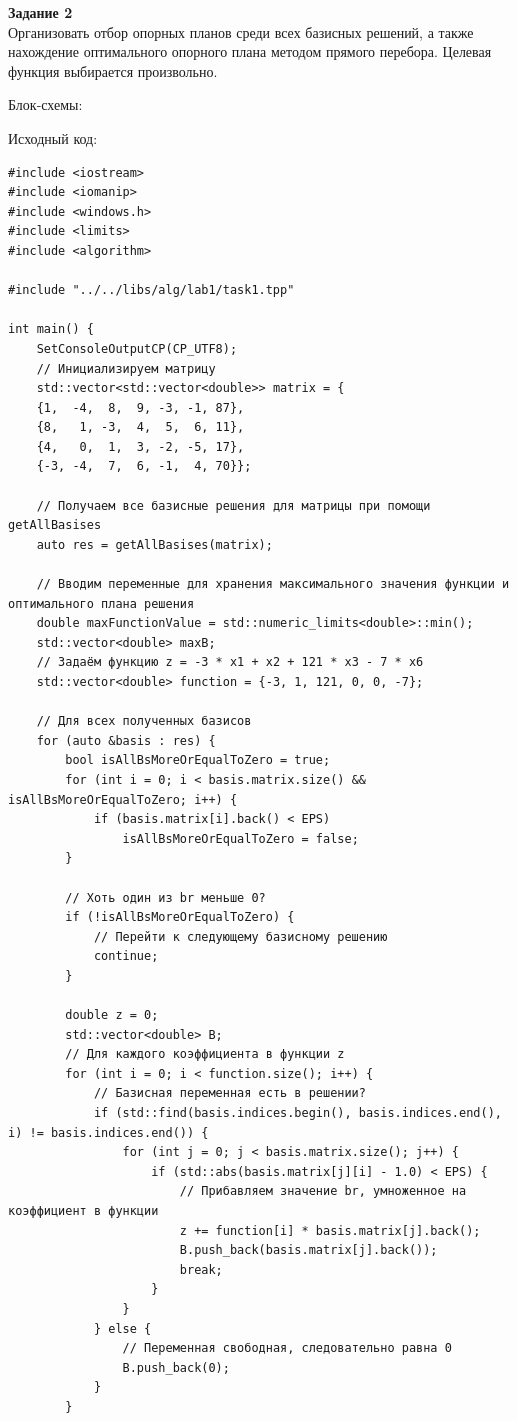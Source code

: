 \documentclass[a4paper,14pt]{extarticle}
\begin{document}
\textbf{Задание 2}\\
Организовать отбор опорных планов среди всех базисных решений, а также нахождение
оптимального опорного плана методом прямого перебора. Целевая функция выбирается
произвольно.\bigbreak

Блок-схемы:
\begin{center}
    
\end{center}
Исходный код:
\begin{verbatim}
#include <iostream>
#include <iomanip>
#include <windows.h>
#include <limits>
#include <algorithm>

#include "../../libs/alg/lab1/task1.tpp"

int main() {
    SetConsoleOutputCP(CP_UTF8);
    // Инициализируем матрицу
    std::vector<std::vector<double>> matrix = {
    {1,  -4,  8,  9, -3, -1, 87},
    {8,   1, -3,  4,  5,  6, 11},
    {4,   0,  1,  3, -2, -5, 17},
    {-3, -4,  7,  6, -1,  4, 70}};

    // Получаем все базисные решения для матрицы при помощи getAllBasises
    auto res = getAllBasises(matrix);

    // Вводим переменные для хранения максимального значения функции и оптимального плана решения 
    double maxFunctionValue = std::numeric_limits<double>::min();
    std::vector<double> maxB;
    // Задаём функцию z = -3 * x1 + x2 + 121 * x3 - 7 * x6
    std::vector<double> function = {-3, 1, 121, 0, 0, -7};

    // Для всех полученных базисов
    for (auto &basis : res) {
        bool isAllBsMoreOrEqualToZero = true;
        for (int i = 0; i < basis.matrix.size() && isAllBsMoreOrEqualToZero; i++) {
            if (basis.matrix[i].back() < EPS) 
                isAllBsMoreOrEqualToZero = false;
        }

        // Хоть один из br меньше 0?
        if (!isAllBsMoreOrEqualToZero) { 
            // Перейти к следующему базисному решению
            continue;
        }

        double z = 0;
        std::vector<double> B;
        // Для каждого коэффициента в функции z
        for (int i = 0; i < function.size(); i++) {
            // Базисная переменная есть в решении?
            if (std::find(basis.indices.begin(), basis.indices.end(), i) != basis.indices.end()) {
                for (int j = 0; j < basis.matrix.size(); j++) {
                    if (std::abs(basis.matrix[j][i] - 1.0) < EPS) {
                        // Прибавляем значение br, умноженное на коэффициент в функции
                        z += function[i] * basis.matrix[j].back();
                        B.push_back(basis.matrix[j].back());
                        break;
                    }
                }
            } else {
                // Переменная свободная, следовательно равна 0
                B.push_back(0);
            }
        }


\end{verbatim}
\end{document}
